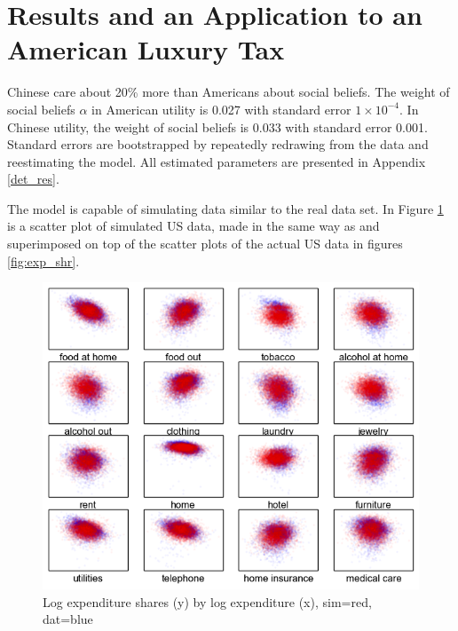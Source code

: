 \section{Results and an Application to an American Luxury Tax}
\label{sec:results}

Chinese care about 20\% more than Americans about social beliefs.  The weight of social beliefs $\alpha$ in American utility is 0.027 with standard error $1\times10^{-4}$.  In Chinese utility, the weight of social beliefs is 0.033 with standard error 0.001.  Standard errors are bootstrapped by repeatedly redrawing from the data and reestimating the model.  All estimated parameters are presented in Appendix \ref{det_res}.

The model is capable of simulating data similar to the real data set. In Figure \ref{fig:shares_fake} is a scatter plot of simulated US data, made in the same way as and superimposed on top of the scatter plots of the actual US data in figures \ref{fig:exp_shr}.
\begin{figure}
	\centering
		\includegraphics[scale=1]{pics/shr_plot_sim.png}
	\caption{Log expenditure shares (y) by log expenditure (x), sim=red, dat=blue}
	\label{fig:shares_fake}
\end{figure}

